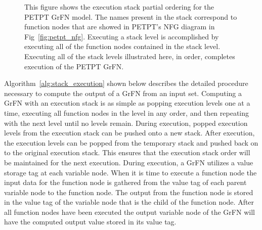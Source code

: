 \begin{figure}[!htbp]
  \centering
  \caption[PETPT GrFN Execution Stack]{This figure shows the execution stack partial ordering for the PETPT GrFN model. The names present in the stack correspond to function nodes that are showed in PETPT's NFG diagram in Fig~\ref{fig:petpt_nfg}. Executing a stack level is accomplished by executing all of the function nodes contained in the stack level. Executing all of the stack levels illustrated here, in order, completes execution of the PETPT GrFN.}
  \label{fig:petpt_execution_stack}
\end{figure}

Algorithm~\ref{alg:stack_execution} shown below describes the detailed procedure necessary to compute the output of a GrFN from an input set.
Computing a GrFN with an execution stack is as simple as popping execution levels one at a time, executing all function nodes in the level in any order, and then repeating with the next level until no levels remain.
During execution, popped execution levels from the execution stack can be pushed onto a new stack.
After execution, the execution levels can be popped from the temporary stack and pushed back on to the original execution stack.
This ensures that the execution stack order will be maintained for the next execution.
During execution, a GrFN utilizes a value storage tag at each variable node.
When it is time to execute a function node the input data for the function node is gathered from the value tag of each parent variable node to the function node.
The output from the function node is stored in the value tag of the variable node that is the child of the function node.
After all function nodes have been executed the output variable node of the GrFN will have the computed output value stored in its value tag.

